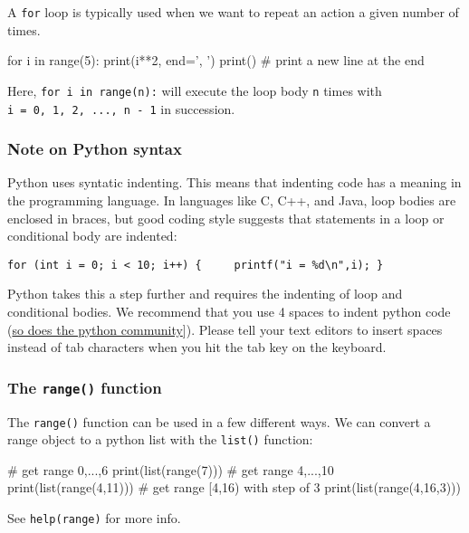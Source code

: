 \documentclass[12pt]{article} \newif\ifsolution\solutiontrue %
\begin{document}
A \texttt{for} loop is typically used when we want to repeat an action a
given number of times.

\begin{python}
for i in range(5):     print(i**2, end=', ') print() # print a new line at the end
\end{python}

Here, \texttt{for\ i\ in\ range(n):} will execute the loop body
\texttt{n} times with \texttt{i\ =\ 0,\ 1,\ 2,\ ...,\ n\ -\ 1} in
succession.

\subsubsection{Note on Python syntax}\label{note-on-python-syntax}

Python uses syntatic indenting. This means that indenting code has a
meaning in the programming language. In languages like C, C++, and Java,
loop bodies are enclosed in braces, but good coding style suggests that
statements in a loop or conditional body are indented:

\begin{verbatim}
for (int i = 0; i < 10; i++) {     printf("i = %d\n",i); }
\end{verbatim}

Python takes this a step further and requires the indenting of loop and
conditional bodies. We recommend that you use 4 spaces to indent python
code
(\href{https://www.python.org/dev/peps/pep-0008/\#tabs-or-spaces}{so
does the python community}{]}). Please tell your text editors to insert
spaces instead of tab characters when you hit the tab key on the
keyboard.

\subsubsection{\texorpdfstring{The \texttt{range()}
function}{The range() function}}\label{the-range-function}

The \texttt{range()} function can be used in a few different ways. We
can convert a range object to a python list with the \texttt{list()}
function:

\begin{python}
# get range 0,...,6 print(list(range(7))) # get range 4,...,10 print(list(range(4,11))) # get range [4,16) with step of 3 print(list(range(4,16,3)))
\end{python}

See \texttt{help(range)} for more info.
\end{document}
